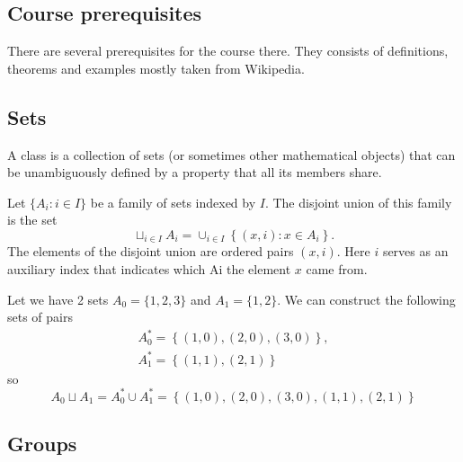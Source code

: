 \begin{appendices}
  
\chapter{Course prerequisites}
There are several prerequisites for the course there. They consists of
definitions, theorems and examples mostly taken from Wikipedia. 

\section{Sets}

\begin{definition}[Class]
  A class is a collection of sets (or sometimes other mathematical
  objects) that can be unambiguously defined by a property that all
  its members share. 
  \label{def:class}
\end{definition}

\begin{definition}
  Let \cite{wiki:disjointunion} $\{A_i: i \in I\}$ be a family of sets
  indexed by $I$. The 
  disjoint union of this family is the set
  \[
  \sqcup_{i \in I} A_i = \cup_{i \in I}\left\{
  \left(x, i\right): x \in A_i
  \right\}.
  \]
  The elements of the disjoint union are ordered pairs $(x, i)$. Here $i$
  serves as an auxiliary index that indicates which Ai the element $x$
  came from.
  \label{def:disjointunion}
\end{definition}

\begin{example}
  Let \cite{wiki:disjointunion} we have 2 sets $A_0 = \{1,2,3\}$ and
  $A_1 = \{1,2\}$. 
  We can construct the following sets of pairs
  \begin{eqnarray}
  A_0^\ast = \left\{
  \left(1,0\right),
  \left(2,0\right),
  \left(3,0\right)
  \right\},
  \nonumber \\
  A_1^\ast = \left\{
  \left(1,1\right),
  \left(2,1\right)
  \right\}  
  \nonumber
  \end{eqnarray}
  so
  \[
  A_0 \sqcup A_1 = A_0^\ast \cup A_1^\ast =
  \left\{
  \left(1,0\right),
  \left(2,0\right),
  \left(3,0\right),
  \left(1,1\right),
  \left(2,1\right)
  \right\}
  \]
  \label{ex:disjointunion}
\end{example}


\section{Groups}


\end{appendices}
